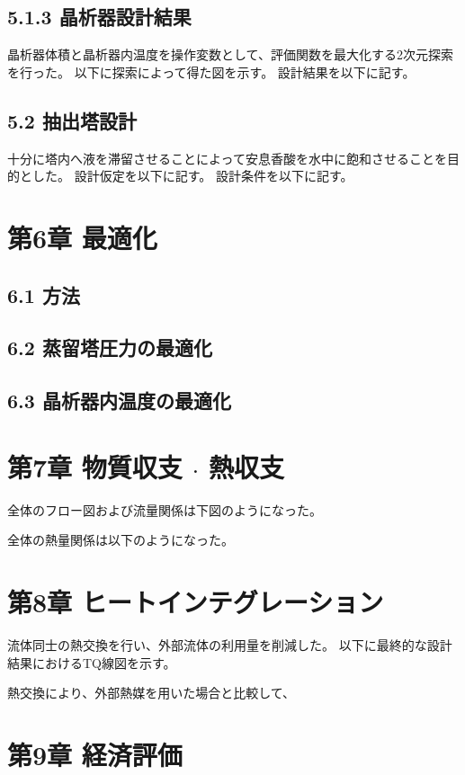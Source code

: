 \documentclass[a4j]{jsarticle}
\begin{document}
\subsection*{5.1.3 晶析器設計結果}
晶析器体積と晶析器内温度を操作変数として、評価関数を最大化する2次元探索を行った。
以下に探索によって得た図を示す。
設計結果を以下に記す。

\subsection*{5.2 抽出塔設計}
十分に塔内へ液を滞留させることによって安息香酸を水中に飽和させることを目的とした。
設計仮定を以下に記す。
設計条件を以下に記す。

\newpage
\section*{第6章 最適化}
\subsection*{6.1 方法}

\subsection*{6.2 蒸留塔圧力の最適化}

\subsection*{6.3 晶析器内温度の最適化}

\newpage
\section*{第7章 物質収支 $\cdot$ 熱収支}
全体のフロー図および流量関係は下図のようになった。

全体の熱量関係は以下のようになった。

\newpage
\section*{第8章 ヒートインテグレーション}
流体同士の熱交換を行い、外部流体の利用量を削減した。
以下に最終的な設計結果におけるTQ線図を示す。

熱交換により、外部熱媒を用いた場合と比較して、

\newpage
\section*{第9章 経済評価}
\end{document}
